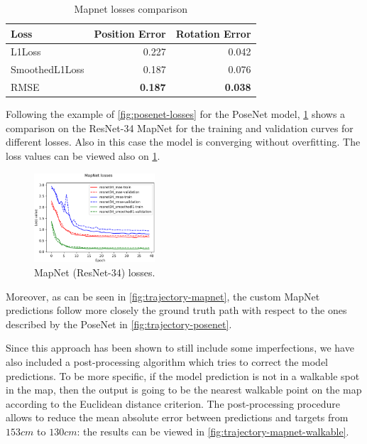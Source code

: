 \begin{table}[htbp]
    \caption{Mapnet losses comparison}
    \begin{center}
        \begin{tabular}{lrr}
            \toprule
            Loss            & {Position Error} & {Rotation Error} \\
            \midrule
            L1Loss          & 0.227            & 0.042            \\
            SmoothedL1Loss  & 0.187            & 0.076            \\
            RMSE            & \textbf{0.187}   & \textbf{0.038}   \\
            \bottomrule
        \end{tabular}
        \label{tab:mapnet-losses}
    \end{center}
\end{table}

Following the example of \cref{fig:posenet-losses} for the PoseNet model, \cref{fig:mapnet-losses} shows a comparison on the ResNet-34 MapNet for the training and validation curves for different losses. Also in this case the model is converging without overfitting. The loss values can be viewed also on \cref{tab:mapnet-losses}.
\begin{figure}[htbp]
    \begin{center}
        \includegraphics[width=0.4\textwidth]{./imgs/mapnet_losses.png}
    \end{center}
    \caption{MapNet (ResNet-34) losses.}
    \label{fig:mapnet-losses}
\end{figure}

Moreover, as can be seen in \cref{fig:trajectory-mapnet}, the custom MapNet predictions follow more closely the ground truth path with respect to the ones described by the PoseNet in \cref{fig:trajectory-posenet}.

Since this approach has been shown to still include some imperfections, we have also included a post-processing algorithm which tries to correct the model predictions. To be more specific, if the model prediction is not in a walkable spot in the map, then the output is going to be the nearest walkable point on the map according to the Euclidean distance criterion. The post-processing procedure allows to reduce the mean absolute error between predictions and targets from $153 cm$ to $130 cm$: the results can be viewed in \cref{fig:trajectory-mapnet-walkable}.

